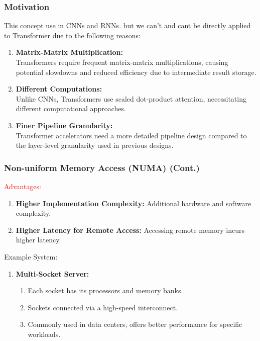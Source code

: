 \documentclass[
	12pt, %
]{beamer}
\begin{document}
\begin{frame}
	\frametitle{Motivation}
	
	This concept use in CNNs and RNNs. but we can't and cant be directly applied to Transformer due to the following reasons:
	
	\begin{enumerate}
		\item 
		\textbf{Matrix-Matrix Multiplication:}\\ 
		Transformers require frequent matrix-matrix multiplications, causing potential slowdowns and reduced efficiency due to intermediate result storage.
		
		\item 
		\textbf{Different Computations:}\\
		Unlike CNNs, Transformers use scaled dot-product attention, necessitating different computational approaches.
		 
		\item 
		\textbf{Finer Pipeline Granularity:}\\
		Transformer accelerators need a more detailed pipeline design compared to the layer-level granularity used in previous designs.
	\end{enumerate}
\end{frame}



\begin{frame}
	\frametitle{Non-uniform Memory Access (NUMA) (Cont.)}
	
	\textcolor{red}{Advantages:}
	\begin{enumerate}
		\item \textbf{Higher Implementation Complexity:} Additional hardware and software complexity.
		\item \textbf{Higher Latency for Remote Access:} Accessing remote memory incurs higher latency.
	\end{enumerate}
	
	Example System:
	\begin{enumerate}
		\item \textbf{Multi-Socket Server:}
		\begin{enumerate}
			\item Each socket has its processors and memory banks.
			\item Sockets connected via a high-speed interconnect.
			\item Commonly used in data centers, offers better performance for specific workloads.
		\end{enumerate}
	\end{enumerate}
\end{frame}
\end{document}
